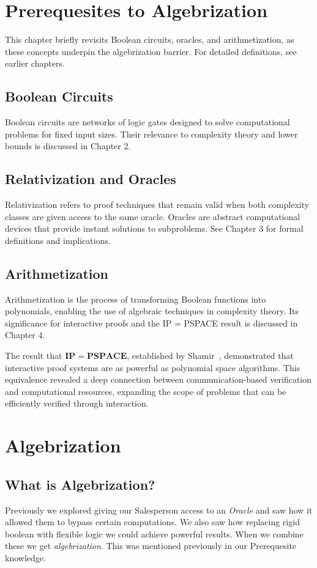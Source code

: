 \documentclass[12pt]{report}
\begin{document}
\newpage
\chapter{Prerequesites to Algebrization}
This chapter briefly revisits Boolean circuits, oracles, and arithmetization, as these concepts underpin the algebrization barrier. For detailed definitions, see earlier chapters.

\section{Boolean Circuits}
Boolean circuits are networks of logic gates designed to solve computational problems for fixed input sizes. Their relevance to complexity theory and lower bounds is discussed in Chapter 2.

\section{Relativization and Oracles}
Relativization refers to proof techniques that remain valid when both complexity classes are given access to the same oracle. Oracles are abstract computational devices that provide instant solutions to subproblems. See Chapter 3 for formal definitions and implications.

\section{Arithmetization}
Arithmetization is the process of transforming Boolean functions into polynomials, enabling the use of algebraic techniques in complexity theory. Its significance for interactive proofs and the IP = PSPACE result is discussed in Chapter 4.

The result that $\mathbf{IP = PSPACE}$, established by Shamir~\citep{shamir1992ip}, demonstrated that interactive proof systems are as powerful as polynomial space algorithms. This equivalence revealed a deep connection between communication-based verification and computational resources, expanding the scope of problems that can be efficiently verified through interaction.

\newpage
\chapter{Algebrization}
\section{What is Algebrization?}
Previously we explored giving our Salesperson access to an \textit{Oracle} and saw how it allowed them to bypass certain computations.
We also saw how replacing rigid boolean with flexible logic we could achieve powerful results.
When we combine these we get \textit{algebrization}.
This was mentioned previously in our Prerequesite knowledge.
\end{document}

